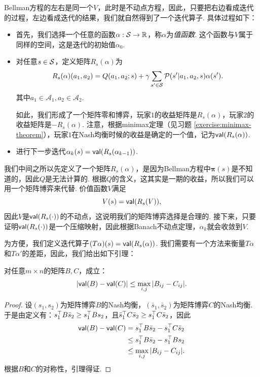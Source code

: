 Bellman方程的左右是同一个$V$，此时是不动点方程，因此，只要把右边看成迭代的过程，左边看成迭代的结果，我们就自然得到了一个迭代算子. 具体过程如下：
\begin{itemize}
    \item 首先，我们选择一个任意的函数$\alpha: \mathcal S\to \mathbb{R}$，称$\alpha$为\textit{值函数}. 这个函数与$V$属于同样的空间，这是迭代的初始值$\alpha_0$.
    \item 对任意$s\in \mathcal S$，定义矩阵$R_s(\alpha)$为
    \[R_s(\alpha)(a_1,a_2) = Q(a_1,a_2;s) + \gamma \sum_{s'\in \mathcal S}\mathcal P(s'|a_1,a_2,s)\alpha(s').\]
    其中$a_1\in \mathcal A_1, a_2\in \mathcal A_2$.
    
    如此，我们形成了一个矩阵零和博弈，玩家$1$的收益矩阵是$R_s(\alpha)$，玩家$2$的收益矩阵是$-R_s(\alpha)$. 注意，根据minimax定理（见习题 \ref{exercise:minimax-theorem}），玩家$1$在Nash均衡时候的收益是确定的一个值，记为$\mathsf{val}(R_s(\alpha))$.
    \item 进行下一步迭代$\alpha_k(s)=\mathsf{val}(R_s(\alpha_{k-1}))$. 
\end{itemize}

我们中间之所以先定义了一个矩阵$R_s(\alpha)$，是因为Bellman方程中$\boldsymbol{\pi}(s)$是不知道的，因此$Q$是无法计算的. 根据$Q$的含义，这其实是一期的收益，所以我们可以用一个矩阵博弈来代替. 价值函数$V$满足
\[V(s)=\mathsf{val}(R_s(V)),\]
因此$V$是$\mathsf{val}(R_s(\cdot))$的不动点，这说明我们的矩阵博弈选择是合理的. 接下来，只要证明$\mathsf{val}(R_s(\cdot))$是一个压缩映射，因此根据Banach不动点定理，$\alpha_k$就会收敛到$V$.

为方便，我们定义迭代算子$(T\alpha)(s) = \mathsf{val}(R_s(\alpha))$. 我们需要有一个方法来衡量$T\alpha$和$T\alpha'$的差距，因此，我们给出如下引理：

\begin{lemma}\label{lemma:matrix-game}
对任意$m\times n$的矩阵$B,C$，成立：
\[|\mathsf{val}(B)-\mathsf{val}(C)| \leq \max_{i,j}|B_{ij} - C_{ij}|.\]
\end{lemma}

\begin{proof}
设$(s_1,s_2)$为矩阵博弈$B$的Nash均衡，$(\bar{s}_1,\bar{s}_2)$为矩阵博弈$C$的Nash均衡. 于是由定义有：$s_1^\top B\bar{s}_2  \ge s_1^\top  B s_2$，且$\bar{s}_1 ^\top  C\bar{s}_2 \ge s_1^\top  C \bar{s}_2 $，因此
\begin{align*}
    \mathsf{val}(B)-\mathsf{val}(C) &= s_1^\top B\bar{s}_2 - s_1^\top  C\bar{s}_2 \\
    &\leq s_1^\top  B\bar{s}_2  - s_1^\top  B s_2 \\
    &\leq \max_{i,j}|B_{ij} - C_{ij}|.
\end{align*}
根据$B$和$C$的对称性，引理得证.
\end{proof}

